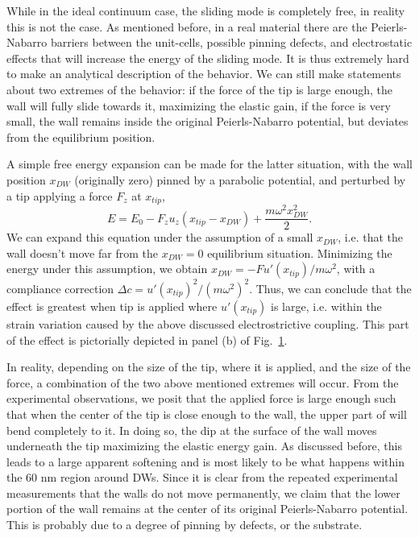 While in the ideal continuum case, the sliding mode is completely free, in reality this is not the case.
As mentioned before, in a real material there are the Peierls-Nabarro barriers between the unit-cells, possible pinning defects, and electrostatic effects that will increase the energy of the sliding mode.
It is thus extremely hard to make an analytical description of the behavior.
We can still make statements about two extremes of the behavior: if the force of the tip is large enough, the wall will fully slide towards it, maximizing the elastic gain, if the force is very small, the wall remains inside the original Peierls-Nabarro potential, but deviates from the equilibrium position.

A simple free energy expansion can be made for the latter situation, with the wall position $x_{DW}$ (originally zero) pinned by a parabolic potential, and perturbed by a tip applying a force $F_z$ at $x_{tip}$,
\begin{equation}
	E = E_0 - F_z u_z (x_{tip} - x_{DW}) + \frac{m\omega^2 x_{DW}^2}{2}.
\end{equation}
We can expand this equation under the assumption of a small $x_{DW}$, i.e. that the wall doesn't move far from the $x_{DW}=0$ equilibrium situation.
Minimizing the energy under this assumption, we obtain $x_{DW} = -F u'(x_{tip})/m \omega^2$, with a compliance correction $\Delta c = u'(x_{tip})^2/(m\omega^2)^2$.
Thus, we can conclude that the effect is greatest when tip is applied where $u'(x_{tip})$ is large, i.e. within the strain variation caused by the above discussed electrostrictive coupling.
This part of the effect is pictorially depicted in panel (b) of Fig.~\ref{fig:BTO_theory}.


\begin{figure}
	\caption{\label{fig:BTO_theory}}
\end{figure}

In reality, depending on the size of the tip, where it is applied, and the size of the force, a combination of the two above mentioned extremes will occur.
From the experimental observations, we posit that the applied force is large enough such that when the center of the tip is close enough to the wall, the upper part of will bend completely to it.
In doing so, the dip at the surface of the wall moves underneath the tip maximizing the elastic energy gain.
As discussed before, this leads to a large apparent softening and is most likely to be what happens within the 60 nm region around DWs.
Since it is clear from the repeated experimental measurements that the walls do not move permanently, we claim that the lower portion of the wall remains at the center of its original Peierls-Nabarro potential.
This is probably due to a degree of pinning by defects, or the substrate.

